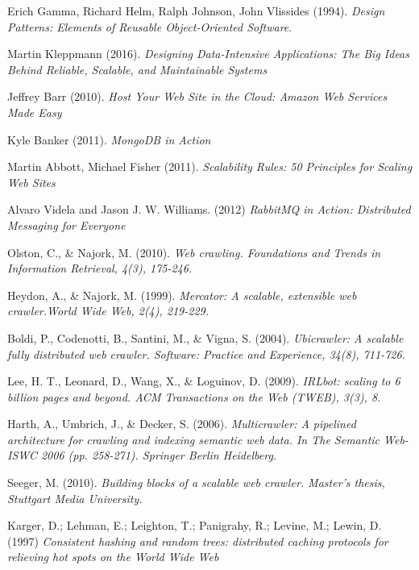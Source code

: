 \renewcommand{\bibname}{References}

\begin{thebibliography}{9}
Erich Gamma, Richard Helm, Ralph Johnson, John Vlissides (1994).
\textit{Design Patterns: Elements of Reusable Object-Oriented Software}.

Martin Kleppmann (2016).
\textit{Designing Data-Intensive Applications: The Big Ideas Behind Reliable, Scalable, and Maintainable Systems}

Jeffrey Barr (2010).
\textit{Host Your Web Site in the Cloud: Amazon Web Services Made Easy}

Kyle Banker (2011).
\textit{MongoDB in Action}

Martin Abbott, Michael Fisher (2011).
\textit{Scalability Rules: 50 Principles for Scaling Web Sites}

Alvaro Videla and Jason J. W. Williams. (2012)
\textit{RabbitMQ in Action: Distributed Messaging for Everyone}

Olston, C., \& Najork, M. (2010).
\textit{Web crawling. Foundations and Trends in Information Retrieval, 4(3), 175-246.}

Heydon, A., \& Najork, M. (1999).
\textit{Mercator: A scalable, extensible web crawler.World Wide Web, 2(4), 219-229.}

Boldi, P., Codenotti, B., Santini, M., \& Vigna, S. (2004).
\textit{Ubicrawler: A scalable fully distributed web crawler. Software: Practice and Experience, 34(8), 711-726.}

Lee, H. T., Leonard, D., Wang, X., \& Loguinov, D. (2009).
\textit{IRLbot: scaling to 6 billion pages and beyond. ACM Transactions on the Web (TWEB), 3(3), 8.}

Harth, A., Umbrich, J., \& Decker, S. (2006).
\textit{Multicrawler: A pipelined architecture for crawling and indexing semantic web data. In The Semantic Web-ISWC 2006 (pp. 258-271). Springer Berlin Heidelberg.}

Seeger, M. (2010).
\textit{Building blocks of a scalable web crawler. Master's thesis, Stuttgart Media University.}

Karger, D.; Lehman, E.; Leighton, T.; Panigrahy, R.; Levine, M.; Lewin, D. (1997)
\textit{Consistent hashing and random trees: distributed caching protocols for relieving hot spots on the World Wide Web}


\end{thebibliography}
